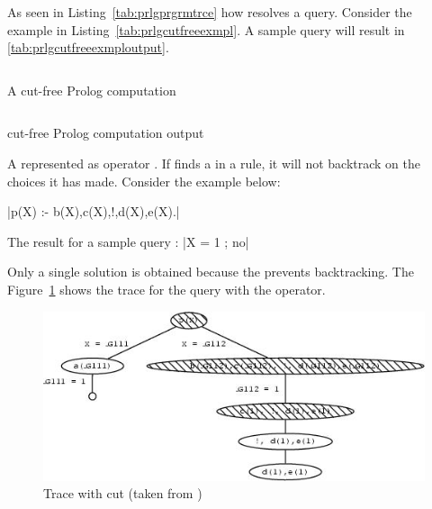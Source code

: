 \documentclass[proposal.tex]{subfiles}
\begin{document}
As seen in Listing~\ref{tab:prlgprgrmtrce} how  resolves a query. Consider the example in 
Listing~\ref{tab:prlgcutfreeexmpl}. A sample query  will result in \ref{tab:prlgcutfreeexmploutput}. 

\begin{code-list}[H]
  \begin{singlespace}
    \inputminted[linenos]{prolog}{prlgcutfreeexmpl.pl}
  \end{singlespace}
  \caption{A cut-free Prolog computation \cite{website:cutprologunionedu}}
\label{tab:prlgcutfreeexmpl}
\end{code-list}

\begin{code-list}[H]
  \begin{singlespace}
    \inputminted[linenos]{prolog}{prlgcutfreeexmploutput.pl}
  \end{singlespace}
  \caption{cut-free Prolog computation output\cite{website:cutprologunionedu}}
\label{tab:prlgcutfreeexmploutput}
\end{code-list}

A  represented as \prologConstruct{!} operator \cite{website:prologcut}.
If  finds a  in a rule, it will not backtrack on the choices it has made. Consider the example below:

|p(X) :- b(X),c(X),!,d(X),e(X).|

The result for a sample query :
|X = 1 ; no|

Only a single solution is obtained because the  prevents backtracking. The Figure~\ref{fig:Trace with cut} shows the 
trace for the query with the  operator.

\begin{figure}[H]
\centering
\includegraphics[scale = .95]{prologcutrace.jpeg}
\caption{Trace with cut (taken from \cite{website:cutprologunionedu})}
\label{fig:Trace with cut}
\end{figure}
\end{document}
